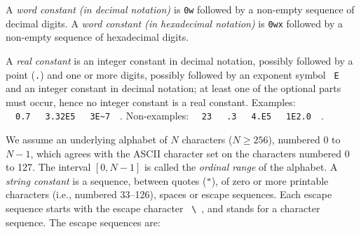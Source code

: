A {\sl word constant (in decimal notation) \sl} is \verb+0w+ followed
by a non-empty sequence of decimal digits.
A {\sl word constant (in
hexadecimal notation)} is \verb+0wx+ followed by a non-empty sequence of
hexadecimal digits.

A {\sl real constant} is an integer constant in decimal notation,
possibly followed by a point ({\tt .}) and one or
more digits, possibly followed by an exponent symbol ~{\tt E}~ and an integer
constant in decimal notation; at least one of the optional parts must occur, hence no integer
constant is a real constant.
Examples: ~~{\tt 0.7}~~~{\tt 3.32E5}~~~\verb(3E~7(~~.  Non-examples:
~~{\tt 23}~~~{\tt .3}~~~{\tt 4.E5}~~~{\tt 1E2.0}~~.

We assume an underlying alphabet of $N$ characters 
($N \geq 256$), numbered 0 to $N-1$, which agrees with the ASCII 
character set on the characters numbered 0 to 127.
The interval $[0, N-1]$ is called the {\sl ordinal range} of
the alphabet.
A {\sl string constant} is a sequence, between quotes ({\tt "}), of zero or
more printable characters (i.e., numbered 33--126), spaces or escape 
sequences.
Each escape sequence starts with the
escape character ~\verb+\+~, and stands for a character sequence. The
escape sequences are:
\smallskip

\smallskip

